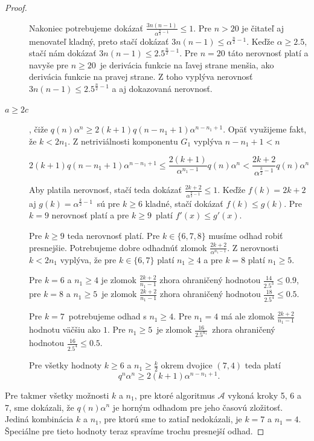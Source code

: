 \begin{proof}
\begin{description}
    Nakoniec potrebujeme dokázať $\frac{3n(n-1)}{\alpha^{\frac{n}{2}-1}} \leq 1$. Pre $n > 20$ je čitateľ aj
    menovateľ kladný, preto stačí dokázať $3n(n-1) \leq \alpha^{\frac{n}{2} - 1}$. Keďže $\alpha \ge 2.5$,
    stačí nám dokázať $3n(n-1) \leq 2.5^{\frac{n}{2} - 1}$. Pre $n = 20$ táto nerovnosť platí a navyše
    pre $n \ge 20$ je derivácia funkcie na ľavej strane menšia, ako derivácia funkcie na pravej strane.
    Z toho vyplýva nerovnosť $3n(n-1) \leq 2.5^{\frac{n}{2}-1}$ a aj dokazovaná nerovnosť.

    \item[$\boxed{a \ge 2c}$], čiže $q(n) \alpha^n \ge 2(k+1)q(n - n_1 + 1)\alpha^{n - n_1 + 1}$.
    Opäť využijeme fakt, že $k < 2n_1$. Z netriviálnosti komponentu $G_1$ vyplýva $n - n_1 + 1 < n$ 

    $$2(k+1)q(n - n_1 + 1)\alpha^{n - n_1 + 1} \leq \frac{2(k+1)}{\alpha^{n_1 - 1}}q(n)\alpha^n < \frac{2k + 2}{\alpha^{\frac{k}{2} - 1}} q(n)\alpha^n$$

    Aby platila nerovnosť, stačí teda dokázať $\frac{2k + 2}{\alpha^{\frac{k}{2} - 1}} \leq 1$. Keďže
    $f(k) = 2k + 2$ aj $g(k) = \alpha^{\frac{k}{2} - 1}$ sú pre $k \ge 6$ kladné, stačí dokázať
    $f(k) \leq g(k)$. Pre $k = 9$ nerovnosť platí a pre $k \ge 9$ platí $f'(x) \leq g'(x)$.

    Pre $k \ge 9$ teda nerovnosť platí. Pre $k \in \{6, 7, 8\}$ musíme odhad robiť presnejšie.
    Potrebujeme dobre odhadnúť zlomok $\frac{2k+2}{\alpha^{n_1 - 1}}$. Z nerovnosti $k < 2n_1$
    vyplýva, že pre $k \in \{6, 7\}$ platí $n_1 \ge 4$ a pre $k = 8$ platí $n_1 \ge 5$.

    Pre $k=6$ a $n_1 \ge 4$ je zlomok $\frac{2k+2}{n_1 - 1}$ zhora ohraničený hodnotou $\frac{14}{2.5^3} \leq 0.9$,
    pre $k=8$ a $n_1 \ge 5$ je zlomok $\frac{2k+2}{n_1 - 1}$ zhora ohraničený hodnotou $\frac{18}{2.5^4} \leq 0.5$.

    Pre $k=7$ potrebujeme odhad s $n_1 \ge 4$. Pre $n_1 = 4$ má ale zlomok $\frac{2k+2}{n_1 - 1}$ hodnotu
    väčšiu ako $1$. Pre $n_1 \ge 5$ je zlomok $\frac{16}{2.5^{n_1}}$ zhora ohraničený hodnotou $\frac{16}{2.5^4} \leq 0.5$.

    Pre všetky hodnoty $k \ge 6$ a $n_1 \ge \frac{k}{2}$ okrem dvojice $(7, 4)$ teda platí
    $$q^n \alpha^n \ge 2(k+1)\alpha^{n - n_1 + 1}.$$

    \end{description}

    Pre takmer všetky možnosti $k$ a $n_1$, pre ktoré algoritmus $\mathcal{A}$ vykoná kroky 5, 6 a 7,
    sme dokázali, že $q(n) \alpha^n$ je horným odhadom pre jeho časovú zložitosť. Jediná kombinácia
    $k$ a $n_1$, pre ktorú sme to zatiaľ nedokázali, je $k=7$ a $n_1 = 4$. Špeciálne pre tieto hodnoty
    teraz spravíme trochu presnejší odhad.


\end{proof}
